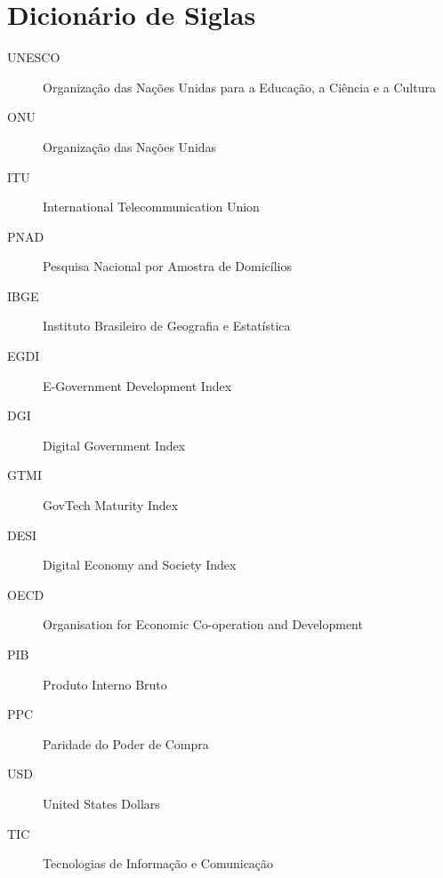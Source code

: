 \chapter*{Dicionário de Siglas}

\begin{description}
    \item[UNESCO] Organização das Nações Unidas para a Educação, a Ciência e a Cultura
    \item[ONU] Organização das Nações Unidas
    \item[ITU] International Telecommunication Union
    \item[PNAD] Pesquisa Nacional por Amostra de Domicílios
    \item[IBGE] Instituto Brasileiro de Geografia e Estatística
    \item[EGDI] E-Government Development Index
    \item[DGI] Digital Government Index  
    \item[GTMI] GovTech Maturity Index
    \item[DESI] Digital Economy and Society Index 
    \item[OECD] Organisation for Economic Co-operation and Development
    \item[PIB] Produto Interno Bruto 
    \item[PPC] Paridade do Poder de Compra 
    \item[USD] United States Dollars
    \item[TIC] Tecnologias de Informação e Comunicação
\end{description}